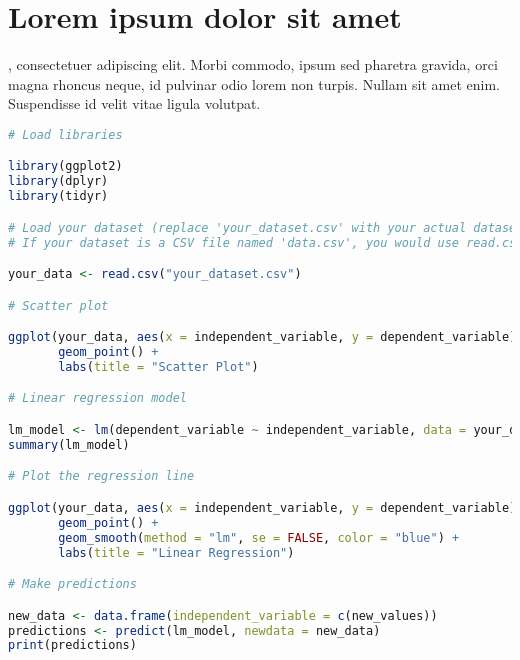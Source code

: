 \chapter{Lorem ipsum dolor sit amet}
\label{chap:capitulo5}

, consectetuer adipiscing elit. Morbi commodo, ipsum sed pharetra gravida, orci magna rhoncus neque, id pulvinar odio lorem non turpis. Nullam sit amet enim. Suspendisse id velit vitae ligula volutpat.

\begin{lstlisting}[language = R, caption = R example]
# Load libraries

library(ggplot2)
library(dplyr)
library(tidyr)

# Load your dataset (replace 'your_dataset.csv' with your actual dataset file).
# If your dataset is a CSV file named 'data.csv', you would use read.csv("data.csv"). If your data is in a different format or location, adjust accordingly.

your_data <- read.csv("your_dataset.csv")

# Scatter plot

ggplot(your_data, aes(x = independent_variable, y = dependent_variable)) +
       geom_point() +
       labs(title = "Scatter Plot")

# Linear regression model

lm_model <- lm(dependent_variable ~ independent_variable, data = your_data)
summary(lm_model)

# Plot the regression line

ggplot(your_data, aes(x = independent_variable, y = dependent_variable)) +
       geom_point() +
       geom_smooth(method = "lm", se = FALSE, color = "blue") +
       labs(title = "Linear Regression")

# Make predictions

new_data <- data.frame(independent_variable = c(new_values))
predictions <- predict(lm_model, newdata = new_data)
print(predictions)
\end{lstlisting}

\lipsum[2]

